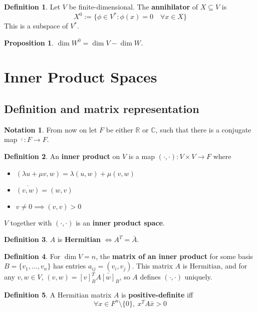 \documentclass[12pt]{article}
\newtheorem{prop}[thm]{Proposition}
\theoremstyle{definition}
\newtheorem*{defn*}{Definition}
\newtheorem*{not*}{Notation}
\begin{document}
\begin{defn*}
	Let $V$ be finite-dimensional.
	The \textbf{annihilator} of $X \subseteq V$ is
	$$X^0 := \{\phi \in V^{\ast} : \phi(x) = 0\quad \forall x \in X\}$$
	This is a subspace of $V^{\ast}$.
\end{defn*}

\begin{prop}
	$\dim{W^0} = \dim{V} - \dim{W}$.
\end{prop}

\section{Inner Product Spaces}

\subsection{Definition and matrix representation}

\begin{not*}
	From now on let $F$ be either $\mathbb{R}$ or $\mathbb{C}$, such that there is a conjugate map $\bar{\cdot} : F \to F$.
\end{not*}

\begin{defn*}
	An \textbf{inner product} on $V$ is a map $(\cdot, \cdot) : V \times V \to F$ where
	\begin{itemize}
		\item $(\lambda u + \mu v, w) = \lambda(u, w) + \mu(v, w)$
		\item $\overline{(v, w)} = (w, v)$
		\item $v \neq 0 \implies (v, v) > 0$
	\end{itemize}
	$V$ together with $(\cdot, \cdot)$ is an \textbf{inner product space}.
\end{defn*}

\begin{defn*}
	$A$ is \textbf{Hermitian} $\iff A^T = \bar{A}$.
\end{defn*}

\begin{defn*}
	For $\dim{V} = n$, the \textbf{matrix of an inner product} for some basis $B = \{v_1, \ldots, v_n\}$ has entries $a_{ij} = (v_i, v_j)$.
	This matrix $A$ is Hermitian, and for any $v, w \in V$, $(v, w) = [v]_B^TA\bar{[w]}_B$, so $A$ defines $(\cdot, \cdot)$ uniquely.
\end{defn*}

\begin{defn*}
	A Hermitian matrix $A$ is \textbf{positive-definite} iff
	$$\forall x \in F^n \setminus \{0\},\  x^TA\bar{x} > 0$$
\end{defn*}
\end{document}
